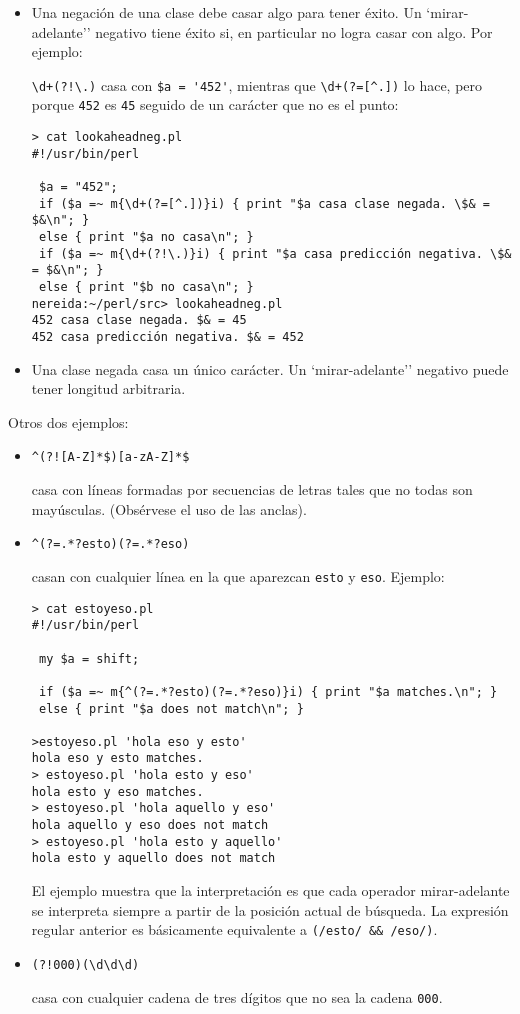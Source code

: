 \begin{itemize}
\item
Una negación de una clase debe casar algo para tener éxito. Un `mirar-adelante'' negativo
tiene éxito si, en particular no logra casar con algo. 
Por ejemplo:

\verb|\d+(?!\.)| casa con \verb|$a = '452'|, mientras que \verb|\d+(?=[^.])| lo hace, pero porque 
\verb|452| es \verb|45| seguido de un carácter que no es el punto:
\begin{verbatim}
> cat lookaheadneg.pl
#!/usr/bin/perl

 $a = "452";
 if ($a =~ m{\d+(?=[^.])}i) { print "$a casa clase negada. \$& = $&\n"; }
 else { print "$a no casa\n"; }
 if ($a =~ m{\d+(?!\.)}i) { print "$a casa predicción negativa. \$& = $&\n"; }
 else { print "$b no casa\n"; }
nereida:~/perl/src> lookaheadneg.pl
452 casa clase negada. $& = 45
452 casa predicción negativa. $& = 452
\end{verbatim}
\item
Una clase negada casa un único carácter. Un `mirar-adelante'' negativo
puede tener longitud arbitraria.
\end{itemize}


Otros dos ejemplos: 

\begin{itemize}
\item
\verb|^(?![A-Z]*$)[a-zA-Z]*$| 

casa con líneas formadas por secuencias de
letras tales que no todas son mayúsculas.
(Obsérvese el uso de las anclas).

\item
\verb|^(?=.*?esto)(?=.*?eso)| 

casan con cualquier línea en la que aparezcan 
\verb|esto| y \verb|eso|. Ejemplo:
\begin{verbatim}
> cat estoyeso.pl
#!/usr/bin/perl

 my $a = shift;

 if ($a =~ m{^(?=.*?esto)(?=.*?eso)}i) { print "$a matches.\n"; }
 else { print "$a does not match\n"; }

>estoyeso.pl 'hola eso y esto'
hola eso y esto matches.
> estoyeso.pl 'hola esto y eso'
hola esto y eso matches.
> estoyeso.pl 'hola aquello y eso'
hola aquello y eso does not match
> estoyeso.pl 'hola esto y aquello'
hola esto y aquello does not match
\end{verbatim}
El ejemplo muestra que la interpretación es que cada 
operador mirar-adelante se interpreta siempre a partir de
la posición actual de búsqueda. La expresión regular anterior
es básicamente equivalente a \verb|(/esto/ && /eso/)|.
\item
\verb|(?!000)(\d\d\d)| 

casa con cualquier cadena de tres dígitos que no
sea la cadena \verb|000|.
\end{itemize}

